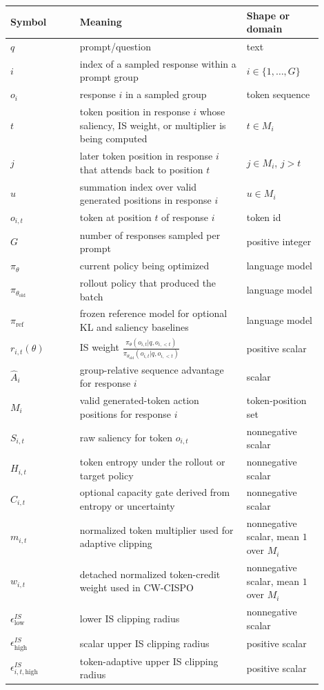 \documentclass[11pt]{article}
\begin{document}
\begin{center}
\small
\begin{tabular}{p{0.20\linewidth}p{0.48\linewidth}p{0.22\linewidth}}
\toprule
Symbol & Meaning & Shape or domain \\
\midrule
$q$ & prompt/question & text \\
$i$ & index of a sampled response within a prompt group & $i \in \{1,\ldots,G\}$ \\
$o_i$ & response $i$ in a sampled group & token sequence \\
$t$ & token position in response $i$ whose saliency, IS weight, or multiplier is being computed & $t \in M_i$ \\
$j$ & later token position in response $i$ that attends back to position $t$ & $j \in M_i$, $j > t$ \\
$u$ & summation index over valid generated positions in response $i$ & $u \in M_i$ \\
$o_{i,t}$ & token at position $t$ of response $i$ & token id \\
$G$ & number of responses sampled per prompt & positive integer \\
$\pi_\theta$ & current policy being optimized & language model \\
$\pi_{\theta_{\mathrm{old}}}$ & rollout policy that produced the batch & language model \\
$\pi_{\mathrm{ref}}$ & frozen reference model for optional KL and saliency baselines & language model \\
$r_{i,t}(\theta)$ & IS weight
  $\frac{\pi_\theta(o_{i,t}|q,o_{i,<t})}
  {\pi_{\theta_{\mathrm{old}}}(o_{i,t}|q,o_{i,<t})}$ & positive scalar \\
$\hat{A}_i$ & group-relative sequence advantage for response $i$ & scalar \\
$M_i$ & valid generated-token action positions for response $i$ & token-position set \\
$S_{i,t}$ & raw saliency for token $o_{i,t}$ & nonnegative scalar \\
$H_{i,t}$ & token entropy under the rollout or target policy & nonnegative scalar \\
$C_{i,t}$ & optional capacity gate derived from entropy or uncertainty & nonnegative scalar \\
$m_{i,t}$ & normalized token multiplier used for adaptive clipping & nonnegative scalar, mean $1$ over $M_i$ \\
$w_{i,t}$ & detached normalized token-credit weight used in CW-CISPO & nonnegative scalar, mean $1$ over $M_i$ \\
$\epsilon^{IS}_{\mathrm{low}}$ & lower IS clipping radius & nonnegative scalar \\
$\epsilon^{IS}_{\mathrm{high}}$ & scalar upper IS clipping radius & positive scalar \\
$\epsilon^{IS}_{i,t,\mathrm{high}}$ & token-adaptive upper IS clipping radius & positive scalar \\
\bottomrule
\end{tabular}
\end{center}
\end{document}
